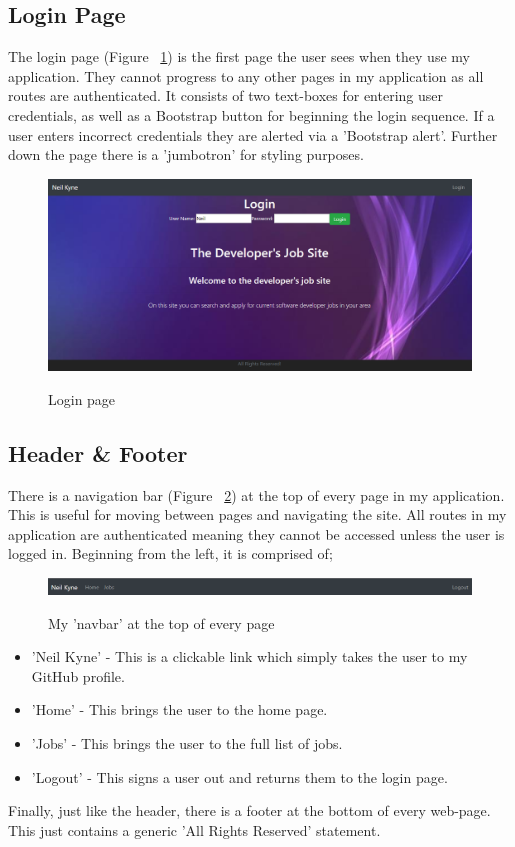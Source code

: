 \subsection{Login Page}
The login page (Figure ~\ref{login_label}) is the first page the user sees when they use my application. They cannot progress to any other pages in my application as all routes are authenticated. It consists of two text-boxes for entering user credentials, as well as a Bootstrap button for beginning the login sequence. If a user enters incorrect credentials they are alerted via a 'Bootstrap alert'. Further down the page there is a 'jumbotron' for styling purposes.

\begin{figure}[ht]
    \centering
    \includegraphics[scale=0.3]{Images/login.png} 
    \label{login_label}
    \caption{Login page}
\end{figure}

\subsection{Header \& Footer}
There is a navigation bar (Figure ~\ref{header_label}) at the top of every page in my application. This is useful for moving between pages and navigating the site. All routes in my application are authenticated meaning they cannot be accessed unless the user is logged in. Beginning from the left, it is comprised of;

\begin{figure}[ht]
    \centering
    \includegraphics[scale=0.35]{Images/header.png} 
    \label{header_label}
    \caption{My 'navbar' at the top of every page}
\end{figure}
\begin{itemize}
    \item 'Neil Kyne' - This is a clickable link which simply takes the user to my GitHub profile.
    \item 'Home' - This brings the user to the home page.
    \item 'Jobs' - This brings the user to the full list of jobs.
    \item 'Logout' - This signs a user out and returns them to the login page.
\end{itemize}
Finally, just like the header, there is a footer at the bottom of every web-page. This just contains a generic 'All Rights Reserved' statement.

